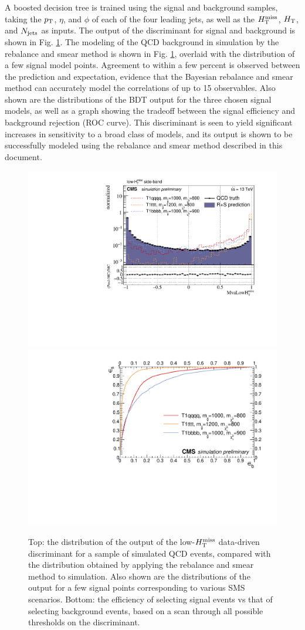A boosted decision tree is trained using the signal and background samples, taking the $p_{\text{T}}$, $\eta$, and $\phi$ of each of the four leading jets, as well as the $H_{\text{T}}^{\rm miss}$, $H_{\rm T}$, and $N_{\rm jets}$ as inputs. The output of the discriminant for signal and background is shown in Fig. \ref{fig:SusyBdt}. The modeling of the QCD background in simulation by the rebalance and smear method is shown in Fig. \ref{fig:SusyBdt}, overlaid with the distribution of a few signal model points. Agreement to within a few percent is observed between the prediction and expectation, evidence that the Bayesian rebalance and smear method can accurately model the correlations of up to 15 observables. Also shown are the distributions of the BDT output for the three chosen signal models, as well as a graph showing the tradeoff between the signal efficiency and background rejection (ROC curve). This discriminant is seen to yield significant increases in sensitivity to a broad class of models, and its output is shown to be successfully modeled using the rebalance and smear method described in this document. 
\begin{figure}[tb!]
\centering
\includegraphics[width=0.7\linewidth]{figures/SusySearches/MvaLowMht.pdf}
\includegraphics[width=0.7\linewidth]{figures/SusySearches/RocCurvesLowMht_QCDVsSUSY.pdf}
\caption{Top: the distribution of the output of the low-$H_{\text{T}}^{\rm miss}$ data-driven discriminant for a sample of simulated QCD events, compared with the distribution obtained by applying the rebalance and smear method to simulation. Also shown are the distributions of the output for a few signal points corresponding to various SMS scenarios. Bottom: the efficiency of selecting signal events vs that of selecting background events, based on a scan through all possible thresholds on the discriminant.}
\label{fig:SusyBdt}
\end{figure}

